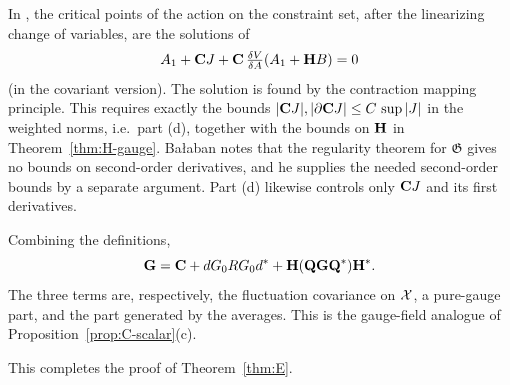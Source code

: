 \begin{remark}\label{x:11.8}
In \cite[(110)--(111)]{BalVar}, the critical points of the action on the constraint set, after the linearizing change of variables, are the solutions of
\[
A_1+\mathbf C J+\mathbf C\,\tfrac{\delta V}{\delta A}(A_1+\mathbf H B)=0
\]
(in the covariant version). The solution is found by the contraction mapping principle. This requires exactly the bounds $|\mathbf C J|,|\partial\mathbf C J|\le C\,\sup|J|$ in the weighted norms, i.e.\ part (d), together with the bounds on $\mathbf H$ in Theorem~\ref{thm:H-gauge}. Ba\l aban notes \cite[Sect.~E]{BalVar} that the regularity theorem for $\mathfrak G$ \cite[Theorem~3.13]{BalBackground} gives no bounds on second-order derivatives, and he supplies the needed second-order bounds by a separate argument. Part (d) likewise controls only $\mathbf C J$ and its first derivatives.
\end{remark}

\begin{remark}\label{x:11.9}
Combining the definitions,
\[
\mathbf G=\mathbf C+dG_0RG_0d^*+\mathbf H(\mathbf Q\mathbf G\mathbf Q^*)\mathbf H^* .
\]
The three terms are, respectively, the fluctuation covariance on $\mathcal X$, a pure-gauge part, and the part generated by the averages. This is the gauge-field analogue of Proposition~\ref{prop:C-scalar}(c).
\end{remark}

This completes the proof of Theorem~\ref{thm:E}.
